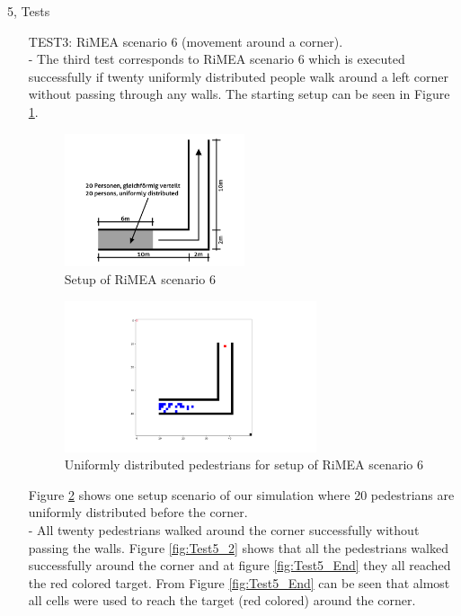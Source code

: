 \documentclass[10pt,a4paper]{article}
\begin{document}
\begin{task}{5, Tests}
\begin{enumerate}
\item[TEST3:] RiMEA scenario 6 (movement around a corner).\\
- The third test corresponds to RiMEA scenario 6 which is executed successfully if twenty uniformly distributed people walk around a left corner without passing through any walls. The starting setup can be seen in Figure \ref{fig:corner}.
\begin{figure}
    \centering
    \includegraphics[width=0.5\textwidth]{pictures/corner.png}
    \caption{Setup of RiMEA scenario 6}
    \label{fig:corner}
\end{figure}
\begin{figure}
    \centering
    \includegraphics[width=0.7\textwidth]{pictures/Test5.png}
    \caption{Uniformly distributed pedestrians for setup of RiMEA scenario 6}
    \label{fig:test5_1}
\end{figure}
Figure \ref{fig:test5_1} shows one setup scenario of our simulation where 20 pedestrians are uniformly distributed before the corner.\\
- All twenty pedestrians walked around the corner successfully without passing the walls. Figure \ref{fig:Test5_2} shows that all the pedestrians walked successfully around the corner and at figure \ref{fig:Test5_End} they all reached the red colored target.
From Figure \ref{fig:Test5_End} can be seen that almost all cells were used to reach the target (red colored) around the corner.
\begin{figure}
    \centering

\end{figure}
\end{enumerate}
\end{task}
\end{document}
